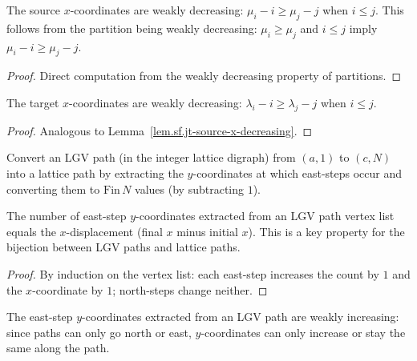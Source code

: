\begin{lemma}
\label{lem.sf.jt-source-x-decreasing}
\leanhelper
\leanok
The source $x$-coordinates are weakly decreasing:
$\mu_i - i \geq \mu_j - j$ when $i \leq j$.
This follows from the partition being weakly decreasing:
$\mu_i \geq \mu_j$ and $i \leq j$ imply $\mu_i - i \geq \mu_j - j$.
\end{lemma}

\begin{proof}
\leanok
Direct computation from the weakly decreasing property of partitions.
\end{proof}

\begin{lemma}
\label{lem.sf.jt-target-x-decreasing}
\leanhelper
\leanok
The target $x$-coordinates are weakly decreasing:
$\lambda_i - i \geq \lambda_j - j$ when $i \leq j$.
\end{lemma}

\begin{proof}
\leanok
Analogous to Lemma~\ref{lem.sf.jt-source-x-decreasing}.
\end{proof}

\begin{definition}
\label{def.sf.lgv-path-to-lattice-path}
\leanhelper
\leanok
Convert an LGV path (in the integer lattice digraph)
from $(a, 1)$ to $(c, N)$ into a lattice path by
extracting the $y$-coordinates at which east-steps occur and converting
them to $\mathrm{Fin}\,N$ values (by subtracting $1$).
\end{definition}

\begin{lemma}
\label{lem.sf.lgv-east-step-length}
\leanhelper
\leanok
The number of east-step $y$-coordinates extracted from an LGV path vertex
list equals the $x$-displacement (final $x$ minus initial $x$).
This is a key property for the bijection between LGV paths and
lattice paths.
\end{lemma}

\begin{proof}
\leanok
By induction on the vertex list: each east-step increases the count by $1$
and the $x$-coordinate by $1$; north-steps change neither.
\end{proof}

\begin{lemma}
\label{lem.sf.lgv-east-step-weakly-increasing}
\leanhelper
\leanok
The east-step $y$-coordinates extracted from an LGV path are weakly
increasing: since paths can only go north or east, $y$-coordinates
can only increase or stay the same along the path.
\end{lemma}

